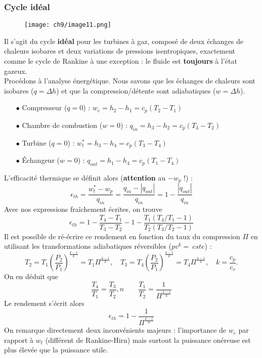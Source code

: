		\subsubsection{Cycle idéal}
		\begin{wrapfigure}[11]{l}{10cm}
		\vspace{-5mm}
	\texttt{[image: ch9/image11.png]}
		\end{wrapfigure}			
	Il s'agit du cycle \textbf{idéal} pour les turbines à gaz, composé de deux échanges 
	de chaleurs isobares et deux variations de pressions isentropiques, exactement comme 
	le cycle de Rankine à une exception : le fluide est \textbf{toujours} à l'état 
	gazeux.\\
	
	Procédons à l'analyse énergétique. Nous savons que les échanges de chaleurs sont 
	isobares ($q = \Delta h$) et que la compression/détente sont adiabatiques ($w=\Delta h$).
	
	\begin{itemize}
	\item[$\bullet$] Compresseur ($q=0$) : $w_c = h_2-h_1 = c_p(T_2-T_1)$
	\item[$\bullet$] Chambre de combustion ($w=0$) : $q_{in} = h_3-h_2 = c_p(T_3-T_2)$
	\item[$\bullet$] Turbine ($q=0$) : $w^*_t = h_3-h_4 = c_p(T_3-T_4)$
	\item[$\bullet$] Échangeur ($w=0$) : $q_{out} = h_1-h_4 = c_p(T_1-T_4)$
	\end{itemize}
	L'efficacité thermique se définit alors (\textbf{attention} au $-w_p$ !) :
	\begin{equation}
	\epsilon_{th} = \dfrac{w_t^*-w_p}{q_{in}} = \dfrac{q_{in}-|q_{out}|}{q_{in}} = 1-
	\dfrac{|q_{out}|}{q_{in}}
	\end{equation}
	Avec nos expressions fraîchement écrites, on trouve
	\begin{equation}
	\epsilon_{th} = 1-\dfrac{T_4-T_1}{T_3-T_2} - 1-\dfrac{T_1(T_4/T_1-1)}{T_2(T_3/T_2-1)}
	\end{equation}
	Il est possible de ré-écrire ce rendement en fonction du taux du compression $\Pi$ en 
	utilisant les transformations adiabatiques réversibles ($pv^k =\ cste$) :
	\begin{equation}
	T_2 = T_1 \left(\dfrac{P_2}{P_1}\right)^\frac{k-1}{k} = T_1\Pi^{\frac{k-1}{k}}, \quad 
	T_3 = T_4 \left(\dfrac{P_2}{P_1}\right)^\frac{k-1}{k} = T_4\Pi^{\frac{k-1}{k}}, \quad k = \dfrac{c_p}{
	c_v}.
	\end{equation}
	On en déduit que
	\begin{equation}
	\dfrac{T_4}{T_1}=\dfrac{T_3}{T_2},n \qquad \dfrac{T_1}{T_2} = \dfrac{1}{\Pi^{\frac{k-1}{k}}}
	\end{equation}
	Le rendement s'écrit alors 
	\begin{equation}
	\epsilon_{th} = 1- \dfrac{1}{\Pi^{\frac{k-1}{k}}}
	\end{equation}
	On remarque directement deux inconvénients majeurs : l'importance de $w_c$ par rapport 
	à $w_t$ (différent de Rankine-Hirn) mais surtout la puissance onéreuse est plus élevée 
	que la puissance utile.
	
